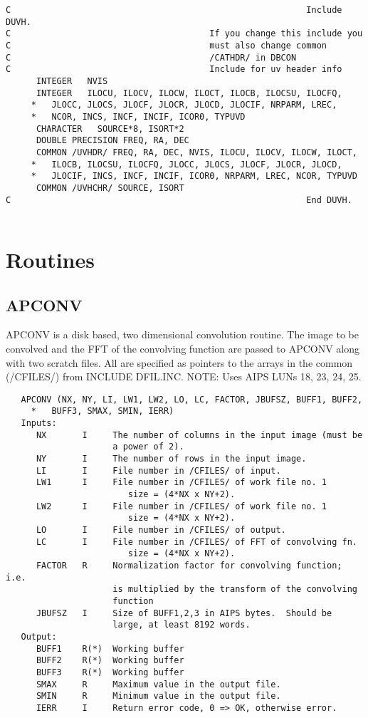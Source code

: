 \begin{verbatim}
C                                                          Include DUVH.
C                                       If you change this include you
C                                       must also change common
C                                       /CATHDR/ in DBCON
C                                       Include for uv header info
      INTEGER   NVIS
      INTEGER   ILOCU, ILOCV, ILOCW, ILOCT, ILOCB, ILOCSU, ILOCFQ,
     *   JLOCC, JLOCS, JLOCF, JLOCR, JLOCD, JLOCIF, NRPARM, LREC,
     *   NCOR, INCS, INCF, INCIF, ICOR0, TYPUVD
      CHARACTER   SOURCE*8, ISORT*2
      DOUBLE PRECISION FREQ, RA, DEC
      COMMON /UVHDR/ FREQ, RA, DEC, NVIS, ILOCU, ILOCV, ILOCW, ILOCT,
     *   ILOCB, ILOCSU, ILOCFQ, JLOCC, JLOCS, JLOCF, JLOCR, JLOCD,
     *   JLOCIF, INCS, INCF, INCIF, ICOR0, NRPARM, LREC, NCOR, TYPUVD
      COMMON /UVHCHR/ SOURCE, ISORT
C                                                          End DUVH.


\end{verbatim}
\section{Routines}
\subsection{APCONV}
APCONV is a disk based, two dimensional convolution routine.
The image to be convolved and the FFT of the convolving function
are passed to APCONV along with two scratch files.  All are specified
as pointers to the arrays in the common (/CFILES/) from INCLUDE
DFIL.INC. NOTE: Uses AIPS LUNs 18, 23, 24, 25.
\begin{verbatim}
   APCONV (NX, NY, LI, LW1, LW2, LO, LC, FACTOR, JBUFSZ, BUFF1, BUFF2,
     *   BUFF3, SMAX, SMIN, IERR)
   Inputs:
      NX       I     The number of columns in the input image (must be
                     a power of 2).
      NY       I     The number of rows in the input image.
      LI       I     File number in /CFILES/ of input.
      LW1      I     File number in /CFILES/ of work file no. 1
                        size = (4*NX x NY+2).
      LW2      I     File number in /CFILES/ of work file no. 1
                        size = (4*NX x NY+2).
      LO       I     File number in /CFILES/ of output.
      LC       I     File number in /CFILES/ of FFT of convolving fn.
                        size = (4*NX x NY+2).
      FACTOR   R     Normalization factor for convolving function; i.e.
                     is multiplied by the transform of the convolving
                     function
      JBUFSZ   I     Size of BUFF1,2,3 in AIPS bytes.  Should be
                     large, at least 8192 words.
   Output:
      BUFF1    R(*)  Working buffer
      BUFF2    R(*)  Working buffer
      BUFF3    R(*)  Working buffer
      SMAX     R     Maximum value in the output file.
      SMIN     R     Minimum value in the output file.
      IERR     I     Return error code, 0 => OK, otherwise error.
\end{verbatim}




